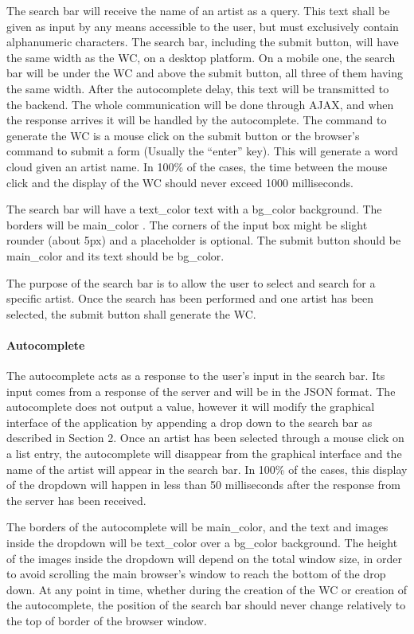 \documentclass[]{article}
\begin{document}
The search bar will receive the name of an artist as a query. This text
shall be given as input by any means accessible to the user, but must
exclusively contain alphanumeric characters. The search bar, including
the submit button, will have the same width as the WC, on a desktop
platform. On a mobile one, the search bar will be under the WC and above
the submit button, all three of them having the same width. After the
autocomplete delay, this text will be transmitted to the backend. The
whole communication will be done through AJAX, and when the response
arrives it will be handled by the autocomplete. The command to generate
the WC is a mouse click on the submit button or the browser's command to
submit a form (Usually the ``enter'' key). This will generate a word
cloud given an artist name. In 100\% of the cases, the time between the
mouse click and the display of the WC should never exceed 1000
milliseconds.

The search bar will have a text\_color text with a bg\_color background.
The borders will be main\_color . The corners of the input box might be
slight rounder (about 5px) and a placeholder is optional. The submit
button should be main\_color and its text should be bg\_color.

The purpose of the search bar is to allow the user to select and search
for a specific artist. Once the search has been performed and one artist
has been selected, the submit button shall generate the WC.

\paragraph{Autocomplete}\label{autocomplete}

The autocomplete acts as a response to the user's input in the search
bar. Its input comes from a response of the server and will be in the
JSON format. The autocomplete does not output a value, however it will
modify the graphical interface of the application by appending a drop
down to the search bar as described in Section 2. Once an artist has
been selected through a mouse click on a list entry, the autocomplete
will disappear from the graphical interface and the name of the artist
will appear in the search bar. In 100\% of the cases, this display of
the dropdown will happen in less than 50 milliseconds after the response
from the server has been received.

The borders of the autocomplete will be main\_color, and the text and
images inside the dropdown will be text\_color over a bg\_color
background. The height of the images inside the dropdown will depend on
the total window size, in order to avoid scrolling the main browser's
window to reach the bottom of the drop down. At any point in time,
whether during the creation of the WC or creation of the autocomplete,
the position of the search bar should never change relatively to the top
of border of the browser window.
\end{document}
